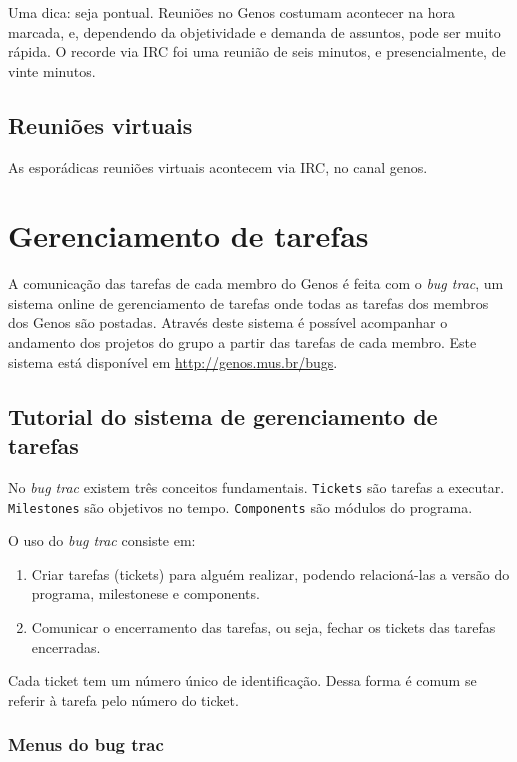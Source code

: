 \documentclass[12pt,brazil]{book}
\newcommand{\eng}[1]{\textit{#1}}
\begin{document}
Uma dica: seja pontual. Reuniões no Genos costumam acontecer na hora
marcada, e, dependendo da objetividade e demanda de assuntos, pode ser
muito rápida. O recorde via IRC foi uma reunião de seis minutos, e
presencialmente, de vinte minutos.

\subsection{Reuniões virtuais}
\label{sec:reunioes-virtuais}

As esporádicas reuniões virtuais acontecem via IRC, no canal genos.

\section{Gerenciamento de tarefas}
\label{sec:gerenc-de-taref}

A comunicação das tarefas de cada membro do Genos é feita com o
\textit{bug trac}, um sistema online de gerenciamento de tarefas onde
todas as tarefas dos membros dos Genos são postadas. Através deste
sistema é possível acompanhar o andamento dos projetos do grupo a
partir das tarefas de cada membro. Este sistema está disponível em
\url{http://genos.mus.br/bugs}.

\subsection{Tutorial do sistema de gerenciamento de tarefas}
\label{sec:tutorial-do-sistema}

No \eng{bug trac} existem três conceitos
fundamentais. \texttt{Tickets} são tarefas a
executar. \texttt{Milestones} são objetivos no
tempo. \texttt{Components} são módulos do programa.

O uso do \eng{bug trac} consiste em:

\begin{enumerate}
\item Criar tarefas (tickets) para alguém realizar, podendo
  relacioná-las a versão do programa, milestonese e components.
\item Comunicar o encerramento das tarefas, ou seja, fechar os tickets
  das tarefas encerradas.
\end{enumerate}

Cada ticket tem um número único de identificação. Dessa forma é comum
se referir à tarefa pelo número do ticket.

\subsubsection{Menus do bug trac}
\label{sec:menus-do-bug}
\end{document}
